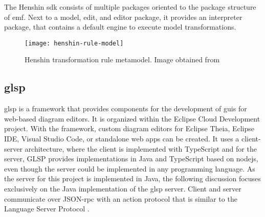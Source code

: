   The Henshin \acs{sdk} consists of multiple packages oriented to the package structure of \ac{emf}. Next to a model, edit, and editor package, it provides an interpreter package, that contains a default engine to execute model transformations.

  \begin{figure}[h]
    \centering
    \texttt{[image: henshin-rule-model]}
    \caption{Henshin transformation rule metamodel. Image obtained from \cite{henshin-repo}}
    \label{fig:henshin-rule-model}
  \end{figure}

  \subsection{\acf{glsp}}
  \label{subsec:glsp}

  \ac{glsp} is a framework that provides components for the development of \acsp{gui} for web-based diagram editors.
  \cite{glsp-repo} It is organized within the Eclipse Cloud Development project. \cite{glsp-doc} With the framework, custom diagram editors for Eclipse Theia, Eclipse IDE, Visual Studio Code, or standalone web apps can be created. It uses a client-server architecture, where the client is implemented with TypeScript and for the server, GLSP provides implementations in Java and TypeScript based on nodejs, even though the server could be implemented in any programming language. As the server for this project is implemented in Java, the following discussion focuses exclusively on the Java implementation of the \ac{glsp} server. Client and server communicate over JSON-\acs{rpc} with an action protocol that is similar to the Language Server Protocol \cite{lsp-repo}. 

